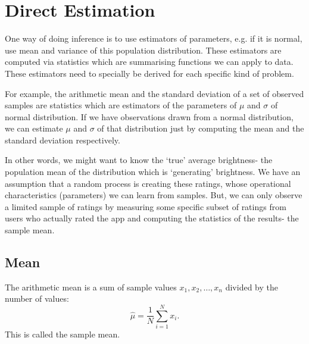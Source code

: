 \documentclass[a4paper, openany]{memoir}
\begin{document}
\section{Direct Estimation}
One way of doing inference is to use estimators of parameters, e.g. if it is normal, use mean and variance of this population distribution. These estimators are computed via statistics which are summarising functions we can apply to data. These estimators need to specially be derived for each specific kind of problem.

For example, the arithmetic mean and the standard deviation of a set of observed samples are statistics which are estimators of the parameters of $\mu$ and $\sigma$ of normal distribution. If we have observations drawn from a normal distribution, we can estimate $\mu$ and $\sigma$ of that distribution just by computing the mean and the standard deviation respectively.

In other words, we might want to know the `true' average brightness- the population mean of the distribution which is `generating' brightness. We have an assumption that a random process is creating these ratings, whose operational characteristics (parameters) we can learn from samples. But, we can only observe a limited sample of ratings by measuring some specific subset of ratings from users who actually rated the app and computing the statistics of the results- the sample mean.

\subsection{Mean}
The arithmetic mean is a sum of sample values $x_1, x_2, \dots, x_n$ divided by the number of values:
\[\hat{\mu} = \frac{1}{N} \sum_{i=1}^N x_i.\]
This is called the sample mean. 
\end{document}
